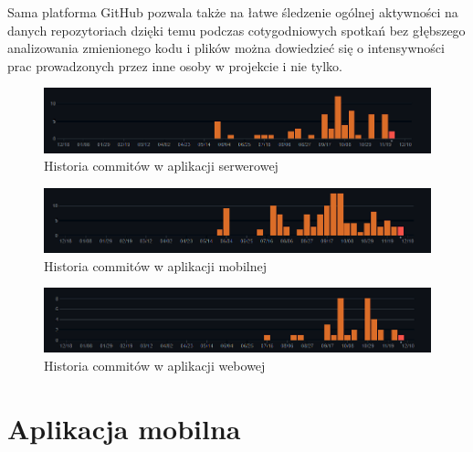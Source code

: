 \documentclass[a4paper,twoside,12pt]{book}
\begin{document}
Sama platforma GitHub pozwala także na łatwe śledzenie ogólnej aktywności na danych repozytoriach dzięki temu podczas cotygodniowych spotkań bez głębszego analizowania zmienionego kodu i plików można dowiedzieć się o intensywności prac prowadzonych przez inne osoby w projekcie i nie tylko.
\begin{figure}[H]
    \centering
    \includegraphics[width=1\textwidth]{github_ss/backend.png}
    \caption{Historia commitów w aplikacji serwerowej}
\end{figure}
\begin{figure}[H]
    \centering
    \includegraphics[width=1\textwidth]{github_ss/mobile.png}
    \caption{Historia commitów w aplikacji mobilnej}
\end{figure}
\begin{figure}[H]
    \centering
    \includegraphics[width=1\textwidth]{github_ss/front.png}
    \caption{Historia commitów w aplikacji webowej}
\end{figure}
 


\chapter{Aplikacja mobilna}
\label{ch:05}


%      
\end{document}
